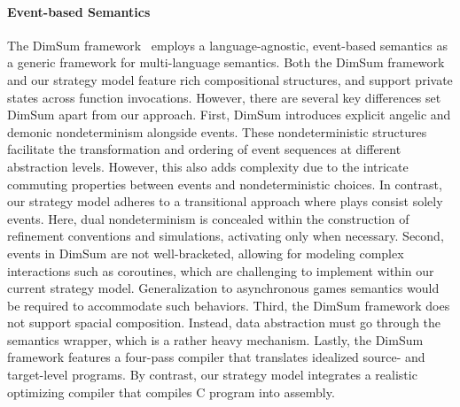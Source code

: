 \documentclass[acmsmall,screen,review,nonacm]{acmart}
\begin{document}
\paragraph{Event-based Semantics}
The DimSum framework~\cite{dimsum}
employs a language-agnostic, event-based semantics
as a generic framework
for multi-language semantics.
Both the DimSum framework
and our strategy model
feature rich compositional structures,
and support private states
across function invocations.
However, there are several key differences
set DimSum apart
from our approach.
First,
DimSum introduces
explicit angelic and demonic nondeterminism
alongside events.
These nondeterministic structures
facilitate the transformation and ordering
of event sequences
at different abstraction levels.
However,
this also adds complexity
due to the intricate
commuting properties between events
and nondeterministic choices.
In contrast,
our strategy model
adheres to a transitional approach
where plays consist solely events.
Here, dual nondeterminism
is concealed within the construction of
refinement conventions and simulations,
activating only when necessary.
Second,
events in DimSum are not
well-bracketed,
allowing for modeling complex interactions
such as coroutines,
which are challenging to implement
within our current strategy model.
Generalization to
asynchronous games semantics
would be required to accommodate such behaviors.
Third,
the DimSum framework
does not support spacial composition.
Instead,
data abstraction must go through
the semantics wrapper,
which is a rather heavy mechanism.
Lastly,
the DimSum framework
features a four-pass compiler
that translates idealized source-
and target-level programs.
By contrast,
our strategy model
integrates a realistic optimizing compiler
that compiles C program into assembly.


%
%
%
\end{document}
